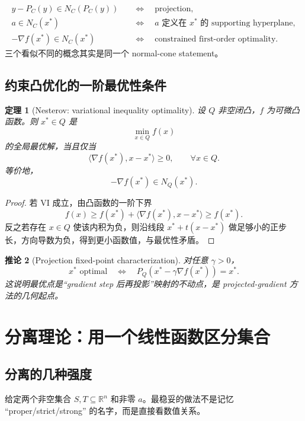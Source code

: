\documentclass[11pt,a4paper,openany]{ctexrep}
\newtheorem{theorem}{定理}[chapter]
\newtheorem{corollary}[theorem]{推论}
\theoremstyle{definition}
\newcommand{\R}{\mathbb{R}}
\newcommand{\inner}[2]{\langle #1,#2\rangle}
\begin{document}
\begin{deepdivebox}[几何语言的统一]
\begin{align*}
y-P_C(y)\in N_C(P_C(y))
&\quad\Longleftrightarrow\quad \text{projection},\\
a\in N_C(x^*)
&\quad\Longleftrightarrow\quad \text{$a$ 定义在 $x^*$ 的 supporting hyperplane},\\
-\nabla f(x^*)\in N_C(x^*)
&\quad\Longleftrightarrow\quad \text{constrained first-order optimality}.
\end{align*}
三个看似不同的概念其实是同一个 normal-cone statement。
\end{deepdivebox}

\section{约束凸优化的一阶最优性条件}
\begin{theorem}[Nesterov: variational inequality optimality]
设 $Q$ 非空闭凸，$f$ 为可微凸函数。则 $x^*\in Q$ 是
\[
\min_{x\in Q} f(x)
\]
的全局最优解，当且仅当
\[
\inner{\nabla f(x^*)}{x-x^*}\ge0,
\qquad \forall x\in Q.
\]
等价地，
\[
-\nabla f(x^*)\in N_Q(x^*).
\]
\end{theorem}
\begin{proof}
若 VI 成立，由凸函数的一阶下界
\[
f(x)\ge f(x^*)+\inner{\nabla f(x^*)}{x-x^*}\ge f(x^*).
\]
反之若存在 $x\in Q$ 使该内积为负，则沿线段 $x^*+t(x-x^*)$ 做足够小的正步长，方向导数为负，得到更小函数值，与最优性矛盾。\cite[\S2.2.3, Thm.~2.2.9]{nesterov}
\end{proof}

\begin{corollary}[Projection fixed-point characterization]
对任意 $\gamma>0$，
\[
x^*\text{ optimal}
\quad\Longleftrightarrow\quad
P_Q\!\left(x^*-\gamma\nabla f(x^*)\right)=x^*.
\]
这说明最优点是“gradient step 后再投影”映射的不动点，是 projected-gradient 方法的几何起点。\cite[\S2.2.3, Thm.~2.2.12]{nesterov}
\end{corollary}

\chapter{分离理论：用一个线性函数区分集合}

\section{分离的几种强度}
给定两个非空集合 $S,T\subseteq\R^n$ 和非零 $a$。最稳妥的做法不是记忆 ``proper/strict/strong'' 的名字，而是直接看数值关系。
\end{document}
